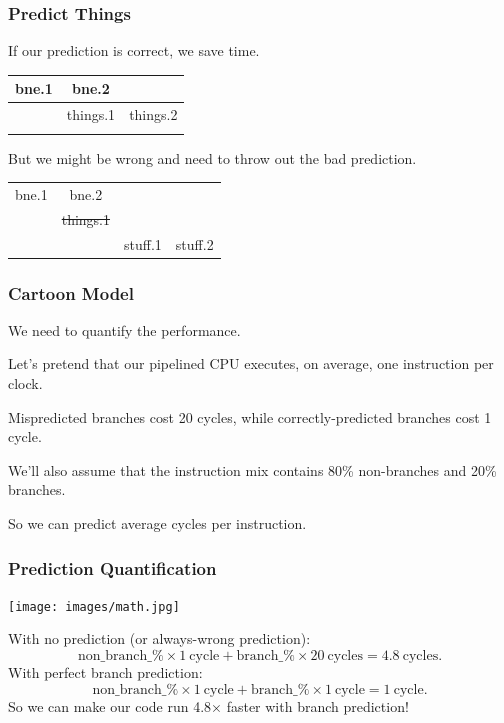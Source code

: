 \begin{frame}
\frametitle{Predict Things}
If our prediction is correct, we save time.

\begin{center}
\begin{tabular}{c|c|c}
bne.1 & bne.2 \\ \hline
& things.1 & things.2 \\
\\
\end{tabular}
\end{center}

But we might be wrong and need to throw out the bad prediction.

\begin{center}
\begin{tabular}{c|c|c|c}
bne.1 & bne.2 \\ \cline{1-2}
& \sout{things.1} \\ \hline
& & stuff.1 & stuff.2
\end{tabular}
\end{center}


\end{frame}



\begin{frame}
\frametitle{Cartoon Model}

We need to quantify the performance.


Let's pretend that our pipelined
CPU executes, on average, one instruction per clock.

Mispredicted branches cost 20 cycles, while correctly-predicted
branches cost 1 cycle. 

We'll also assume that the instruction
mix contains 80\% non-branches and 20\% branches. 

So we can predict
average cycles per instruction.


\end{frame}

\begin{frame}
\frametitle{Prediction Quantification}

\begin{center}
	\texttt{[image: images/math.jpg]}
\end{center}

With no prediction (or always-wrong prediction):
\[
\mathrm{non\_branch\_\%} \times 1 \mathrm{~cycle} + \mathrm{branch\_\%} \times 20 \mathrm{~cycles} = 4.8 \mathrm{~cycles}.
\]
With perfect branch prediction:
\[
\mathrm{non\_branch\_\%} \times 1 \mathrm{~cycle} + \mathrm{branch\_\%} \times 1 \mathrm{~cycle} = 1 \mathrm{~cycle}.
\]
So we can make our code run 4.8$\times$ faster with branch prediction!

\end{frame}


